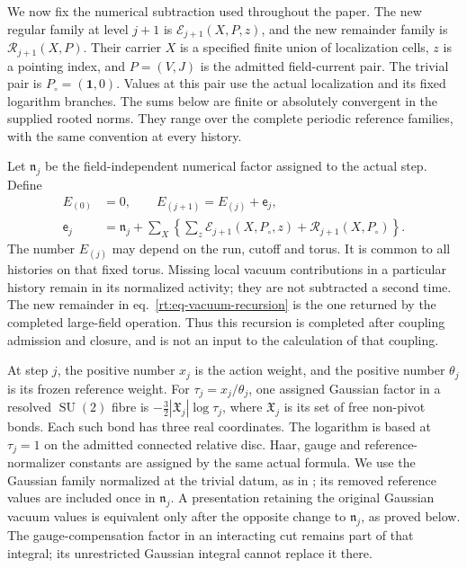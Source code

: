 \documentclass[11pt,letterpaper,reqno]{amsart}
\numberwithin{equation}{section}
\renewcommand{\eqref}[1]{\textup{eq.~\ref{#1}}}
\theoremstyle{definition}
\theoremstyle{remark}
\begin{document}
We now fix the numerical subtraction used throughout the paper.
The new regular family at level $j+1$ is
$\mathcal E_{j+1}(X,P,z)$, and the new remainder family is
$\mathcal R_{j+1}(X,P)$. Their carrier $X$ is a specified finite
union of localization cells, $z$ is a pointing index, and
$P=(V,J)$ is the admitted field-current pair. The trivial pair is
$P_\circ=(\mathbf1,0)$. Values at this pair use the actual
localization and its fixed logarithm branches. The sums below
are finite or absolutely convergent in the supplied rooted norms.
They range over the complete periodic reference families, with
the same convention at every history.

Let $\mathfrak n_j$ be the field-independent numerical factor
assigned to the actual step. Define
\begin{equation}\label{rt:eq-vacuum-recursion}
 \begin{aligned}
 E_{(0)}&=0,\qquad E_{(j+1)}=E_{(j)}+\mathsf e_j,\\
 \mathsf e_j&=\mathfrak n_j+
   \sum_X\left\{\sum_z\mathcal E_{j+1}(X,P_\circ,z)
                            +\mathcal R_{j+1}(X,P_\circ)\right\}.
 \end{aligned}
\end{equation}
The number $E_{(j)}$ may depend on the run, cutoff and torus.
It is common to all histories on that fixed torus. Missing local
vacuum contributions in a particular history remain in its
normalized activity; they are not subtracted a second time.
The new remainder in \eqref{rt:eq-vacuum-recursion} is the one
returned by the completed large-field operation. Thus this
recursion is completed after coupling admission and closure,
and is not an input to the calculation of that coupling.

At step $j$, the positive number $x_j$ is the action weight,
and the positive number $\theta_j$ is its frozen reference weight.
For $\tau_j=x_j/\theta_j$, one assigned Gaussian factor in a
resolved $\operatorname{SU}(2)$ fibre is
$-\tfrac32|\mathfrak X_j|\log\tau_j$, where
$\mathfrak X_j$ is its set of free non-pivot bonds.
Each such bond has three real coordinates. The logarithm is
based at $\tau_j=1$ on the admitted connected relative disc.
Haar, gauge and reference-normalizer constants are assigned by
the same actual formula. We use the Gaussian family normalized
at the trivial datum, as in \cite[\S4]{EM}; its removed reference
values are included once in $\mathfrak n_j$. A presentation
retaining the original Gaussian vacuum values is equivalent
only after the opposite change to $\mathfrak n_j$, as proved
below. The gauge-compensation factor
in an interacting cut remains part of that integral; its
unrestricted Gaussian integral cannot replace it there.
\end{document}
